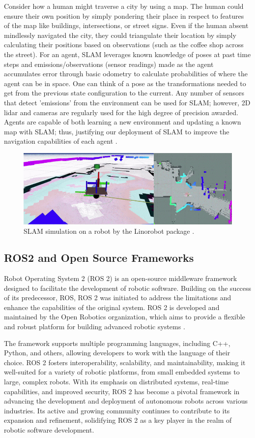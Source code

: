 \documentclass[conference]{IEEEtran}
\begin{document}
Consider how a human might traverse a city by using a map. The human could ensure their own position by simply pondering their place in respect to features of the map like buildings, intersections, or street signs. Even if the human absent mindlessly navigated the city, they could triangulate their location by simply calculating their positions based on observations (such as the coffee shop across the street). For an agent, SLAM leverages known knowledge of poses at past time steps and emissions/observations (sensor readings) made as the agent accumulates error through basic odometry to calculate probabilities of where the agent can be in space. One can think of a pose as the transformations needed to get from the previous state configuration to the current. Any number of sensors that detect 'emissions' from the environment can be used for SLAM; however, 2D lidar and cameras are regularly used for the high degree of precision awarded. Agents are capable of both learning a new environment and updating a known map with SLAM; thus, justifying our deployment of SLAM to improve the navigation capabilities of each agent \cite{Macenski2021}.
\begin{figure}
	\includegraphics[width=\linewidth]{./figs/SLAM.png}
	\caption{SLAM simulation on a robot by the Linorobot package \cite{Linorobot}.}
\end{figure}
\subsection{ROS2 and Open Source Frameworks} 
Robot Operating System 2 (ROS 2) is an open-source middleware framework designed to facilitate the development of robotic software. Building on the success of its predecessor, ROS, ROS 2 was initiated to address the limitations and enhance the capabilities of the original system. ROS 2 is developed and maintained by the Open Robotics organization, which aims to provide a flexible and robust platform for building advanced robotic systems \cite{RN200}. 

The framework supports multiple programming languages, including C++, Python, and others, allowing developers to work with the language of their choice. ROS 2 fosters interoperability, scalability, and maintainability, making it well-suited for a variety of robotic platforms, from small embedded systems to large, complex robots. With its emphasis on distributed systems, real-time capabilities, and improved security, ROS 2 has become a pivotal framework in advancing the development and deployment of autonomous robots across various industries. Its active and growing community continues to contribute to its expansion and refinement, solidifying ROS 2 as a key player in the realm of robotic software development.
\end{document}
